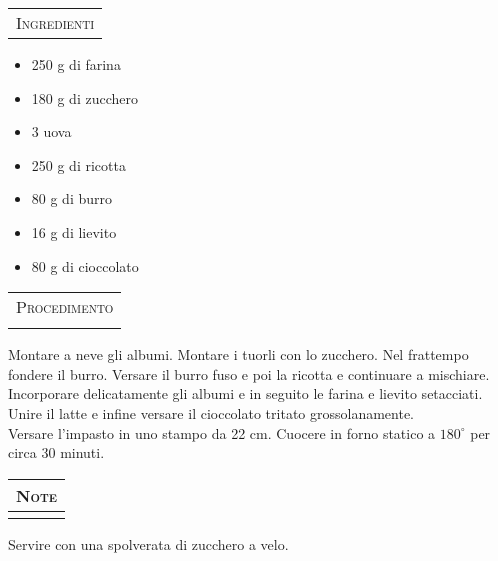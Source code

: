 \noindent
\begin{minipage}[t][\textheight][t]{\textwidth}


    \begin{minipage}[t]{0.3\textwidth}
        \vspace{2.5cm}

        \begin{tabularx}{\linewidth}{X}
        {\Large \textsc{Ingredienti}} \\ %
        \end{tabularx}

        \begin{itemize}[label={}, left=10pt]
			\item 250 g di farina
			\item 180 g di zucchero
			\item 3 uova
			\item 250 g di ricotta
			\item 80 g di burro
			\item 16 g di lievito
			\item 80 g di cioccolato
        \end{itemize}

    \end{minipage}%
    \hfill
    \begin{minipage}[t]{0.65\textwidth}
        \begin{tabularx}{\linewidth}{X}
        \\
        {\Large \textsc{Procedimento}} \\ \\%
        \end{tabularx}
		Montare a neve gli albumi. Montare i tuorli con lo zucchero. Nel frattempo fondere il burro. Versare il burro fuso e poi la ricotta e continuare a mischiare.\\
		Incorporare delicatamente gli albumi e in seguito le farina e lievito setacciati. Unire il latte e infine versare il cioccolato tritato grossolanamente.\\
		Versare l'impasto in uno stampo da 22 cm. Cuocere in forno statico a $180^{\circ}$ per circa 30 minuti.
        
    \end{minipage}
    
    \vspace*{\fill}

    \begin{tabularx}{\linewidth}{X}
    {\Large \textsc{Note}} \\ \hline \hline \\
    \end{tabularx}
	Servire con una spolverata di zucchero a velo.
    
\end{minipage}